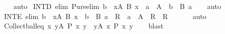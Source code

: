 \begin{isabellebody}
%
\isadelimproof
\ \ %
\endisadelimproof
%
\isatagproof
{}\isamarkupfalse%
\ auto%
\endisatagproof
{\isafoldproof}%
%
\isadelimproof
\isanewline
%
\endisadelimproof
\isanewline
{}\isamarkupfalse%
\ INT{\isacharunderscore}{\kern0pt}D\ {\isacharbrackleft}{\kern0pt}elim{\isacharcomma}{\kern0pt}\ Pure{\isachardot}{\kern0pt}elim{\isacharbrackright}{\kern0pt}{\isacharcolon}{\kern0pt}\ {\isachardoublequoteopen}b\ {\isasymin}\ {\isacharparenleft}{\kern0pt}{\isasymInter}x{\isasymin}A{\isachardot}{\kern0pt}\ B\ x{\isacharparenright}{\kern0pt}\ {\isasymLongrightarrow}\ a\ {\isasymin}\ A\ {\isasymLongrightarrow}\ b\ {\isasymin}\ B\ a{\isachardoublequoteclose}\isanewline
%
\isadelimproof
\ \ %
\endisadelimproof
%
\isatagproof
{}\isamarkupfalse%
\ auto%
\endisatagproof
{\isafoldproof}%
%
\isadelimproof
\isanewline
%
\endisadelimproof
\isanewline
{}\isamarkupfalse%
\ INT{\isacharunderscore}{\kern0pt}E\ {\isacharbrackleft}{\kern0pt}elim{\isacharbrackright}{\kern0pt}{\isacharcolon}{\kern0pt}\ {\isachardoublequoteopen}b\ {\isasymin}\ {\isacharparenleft}{\kern0pt}{\isasymInter}x{\isasymin}A{\isachardot}{\kern0pt}\ B\ x{\isacharparenright}{\kern0pt}\ {\isasymLongrightarrow}\ {\isacharparenleft}{\kern0pt}b\ {\isasymin}\ B\ a\ {\isasymLongrightarrow}\ R{\isacharparenright}{\kern0pt}\ {\isasymLongrightarrow}\ {\isacharparenleft}{\kern0pt}a\ {\isasymnotin}\ A\ {\isasymLongrightarrow}\ R{\isacharparenright}{\kern0pt}\ {\isasymLongrightarrow}\ R{\isachardoublequoteclose}\isanewline
\ \ %
\isanewline
%
\isadelimproof
\ \ %
\endisadelimproof
%
\isatagproof
{}\isamarkupfalse%
\ auto%
\endisatagproof
{\isafoldproof}%
%
\isadelimproof
\isanewline
%
\endisadelimproof
\isanewline
{}\isamarkupfalse%
\ Collect{\isacharunderscore}{\kern0pt}ball{\isacharunderscore}{\kern0pt}eq{\isacharcolon}{\kern0pt}\ {\isachardoublequoteopen}{\isacharbraceleft}{\kern0pt}x{\isachardot}{\kern0pt}\ {\isasymforall}y{\isasymin}A{\isachardot}{\kern0pt}\ P\ x\ y{\isacharbraceright}{\kern0pt}\ {\isacharequal}{\kern0pt}\ {\isacharparenleft}{\kern0pt}{\isasymInter}y{\isasymin}A{\isachardot}{\kern0pt}\ {\isacharbraceleft}{\kern0pt}x{\isachardot}{\kern0pt}\ P\ x\ y{\isacharbraceright}{\kern0pt}{\isacharparenright}{\kern0pt}{\isachardoublequoteclose}\isanewline
%
\isadelimproof
\ \ %
\endisadelimproof
%
\isatagproof
{}\isamarkupfalse%
\ blast%
\endisatagproof
{\isafoldproof}%
%
\isadelimproof
\isanewline
%
\endisadelimproof
\isanewline

\end{isabellebody}
